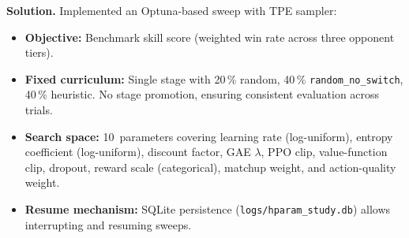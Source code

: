 \textbf{Solution.} Implemented an Optuna-based sweep with TPE sampler:
\begin{itemize}
  \item \textbf{Objective:} Benchmark skill score (weighted win rate across
        three opponent tiers).
  \item \textbf{Fixed curriculum:} Single stage with 20\,\% random,
        40\,\% \texttt{random\_no\_switch}, 40\,\% heuristic.  No stage
        promotion, ensuring consistent evaluation across trials.
  \item \textbf{Search space:} 10~parameters covering learning rate
        (log-uniform), entropy coefficient (log-uniform), discount factor,
        GAE $\lambda$, PPO clip, value-function clip, dropout, reward scale
        (categorical), matchup weight, and action-quality weight.
  \item \textbf{Resume mechanism:} SQLite persistence
        (\texttt{logs/hparam\_study.db}) allows interrupting and resuming
        sweeps.
\end{itemize}
